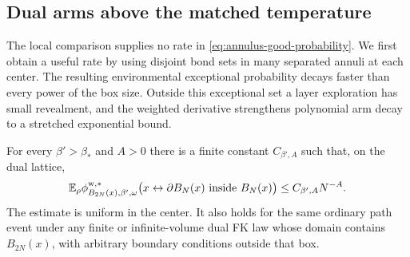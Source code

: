 \subsection{Dual arms above the matched temperature}

The local comparison supplies no rate in
\eqref{eq:annulus-good-probability}. We first obtain a useful rate
by using disjoint bond sets in many separated annuli at each center.
The resulting environmental exceptional probability decays faster
than every power of the box size. Outside this exceptional set a
layer exploration has small revealment, and the weighted derivative
strengthens polynomial arm decay to a stretched exponential bound.

\begin{lemma}
\label{lem:dual-arms}
For every $\beta'>\beta_*$ and $A>0$ there is a finite constant
$C_{\beta',A}$ such that, on the dual lattice,
\begin{equation}
 \mathbb E_\rho\phi_{B_{2N}(x),\beta',\omega}^{\mathrm w,*}
  \bigl(x\leftrightarrow\partial B_N(x)
                    \text{ inside }B_N(x)\bigr)
                     \le C_{\beta',A}N^{-A}.
 \label{eq:dual-arm-bound}
\end{equation}
The estimate is uniform in the center. It also holds for the same
ordinary path event under any finite or infinite-volume dual FK law
whose domain contains $B_{2N}(x)$, with arbitrary boundary conditions
outside that box.
\end{lemma}

